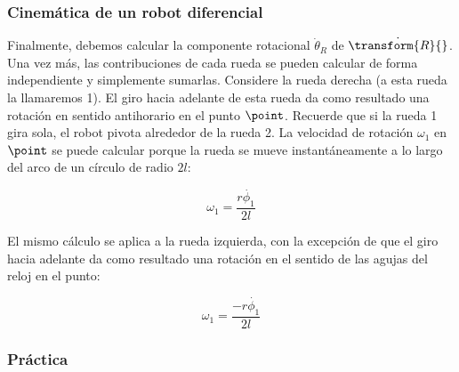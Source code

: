 \begin{frame}
    \frametitle{Cinemática de un robot diferencial}
    \small

    Finalmente, debemos calcular la componente rotacional $\dot{\theta}_{R}$ de $\dot{\transform{R}{}}$. Una vez más, las contribuciones de cada rueda se pueden calcular de forma independiente y simplemente sumarlas. Considere la rueda derecha (a esta rueda la llamaremos 1). El giro hacia adelante de esta rueda da como resultado una rotación en sentido antihorario en el punto $\point$. Recuerde que si la rueda 1 gira sola, el robot pivota alrededor de la rueda 2. La velocidad de rotación $\omega_{1}$ en $\point$ se puede calcular porque la rueda se mueve instantáneamente a lo largo del arco de un círculo de radio $2l$:

    \begin{equation*}
        \omega_{1} = \dfrac{r\dot{\phi_{1}}}{2l}
    \end{equation*}

    El mismo cálculo se aplica a la rueda izquierda, con la excepción de que el giro hacia adelante da como resultado una rotación en el sentido de las agujas del reloj en el punto:

    \begin{equation*}
        \omega_{1} = \dfrac{-r\dot{\phi_{1}}}{2l}
    \end{equation*}
\end{frame}

\begin{frame}
    \frametitle{Práctica}
\end{frame}

